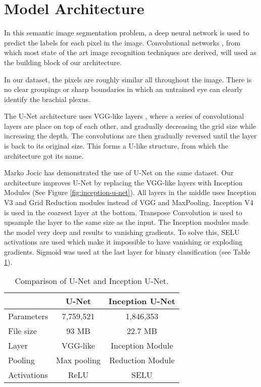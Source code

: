 \section{Model Architecture}
In this semantic image segmentation problem, a deep neural network is used to predict the labels for each pixel in the image. Convolutional networks \cite{Lecun98gradient-basedlearning}, from which most state of the art image recognition techniques are derived, will used as the building block of our architecture.

In our dataset, the pixels are roughly similar all throughout the image. There is no clear groupings or sharp boundaries in which an untrained eye can clearly identify the brachial plexus.

The U-Net architecture \cite{2015arXiv150504597R} uses VGG-like layers \cite{2014arXiv1409.1556S}, where a series of convolutional layers are place on top of each other, and gradually decreasing the grid size while increasing the depth. The convolutions are then gradually reversed until the layer is back to its original size. This forms a U-like structure, from which the architecture got its name.

Marko Jocic \cite{jocicmarko-ultrasound-segmentation} has demonstrated the use of U-Net on the same dataset. Our architecture improves U-Net by replacing the VGG-like layers with Inception Modules \cite{2015arXiv151200567S} (See Figure \ref{fig:inception-u-net}). All layers in the middle uses Inception V3 and Grid Reduction modules instead of VGG and MaxPooling. Inception V4 is used in the coarsest layer at the bottom. Transpose Convolution \cite{2016arXiv160307285D} is used to upsample the layer to the same size as the input. The Inception modules made the model very deep and results to vanishing gradients. To solve this, SELU \cite{2017arXiv170602515K} activations are used which make it impossible to have vanishing or exploding gradients. Sigmoid was used at the last layer for binary classification (see Table \ref{tab:comparison}).
\begin{table}[h]
	\centering
	\begin{tabular}{l c c}
	\toprule
	\ & U-Net & Inception U-Net \\
	\midrule
	\midrule
 	Parameters & 7,759,521\footnotemark  & 1,846,353\footnotemark[\value{footnote}] \\
	File size       & 93 MB\footnotemark[\value{footnote}]       & 22.7 MB\footnotemark[\value{footnote}] \\
    Layer           & VGG-like    & Inception Module \\
	Pooling			& Max pooling & Reduction Module \\
    Activations     & ReLU        & SELU \\
	\bottomrule
		
	\end{tabular}
	\caption{Comparison of U-Net and Inception U-Net.}
\label{tab:comparison}
\end{table}

